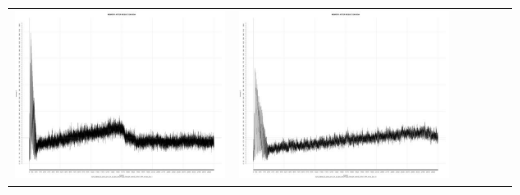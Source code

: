 \begin{table}[htbp]
{\begin{tabular}{l | ccccc}
\begin{minipage}{.15\textwidth}
     			 	\includegraphics[width=\linewidth]{images/mema-triple/N4}
    				 \end{minipage}
    			   &	 \begin{minipage}{.15\textwidth}\vspace{2pt}     							
     			 	\includegraphics[width=\linewidth]{images/mema-triple/N8}
    				 \end{minipage}
    			   &	 \begin{minipage}{.15\textwidth}\vspace{2pt}     							

\end{minipage}
\end{tabular}}
\end{table}
